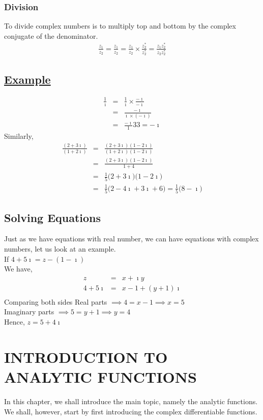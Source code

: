 \documentclass[11pt]{report}
\newcommand{\ubt}[1]{\textbf{\underline{#1}}}
\newcommand{\sps}{\\[0.2cm]}
\newcommand{\imaginary}{\imath}
\newcommand{\example}[1]{\section*{\ubt{Example #1}}}
\begin{document}
	\subsection{Division}
	To divide complex numbers is to multiply top and bottom by the complex conjugate of the denominator.
	\begin{eqnarray*}
		\frac{z_1}{z_2} = \frac{z_1}{z_2}= \frac{z_1}{z_2} \times \frac{z^{*}_2}{z^{*}_2} = \frac{z_1z^{*}_2}{z_2z^{*}_2}
	\end{eqnarray*}
	\example{}
	\begin{eqnarray*}
		\frac{1}{\imaginary} &=&\frac{1}{\imaginary} \times \frac{-\imaginary}{-\imaginary}\sps
		&=&\frac{-\imaginary}{\imaginary\times(-\imaginary)}\sps
		&=& \frac{-\imaginary}{1}33
		= -\imaginary		
	\end{eqnarray*}
	Similarly,
	\begin{eqnarray*}
		\frac{(2+3\imaginary)}{(1+2\imaginary)} &=& \frac{(2+3\imaginary)(1-2\imaginary)}{(1+2\imaginary)(1-2\imaginary)}\sps
		&=&\frac{(2+3\imaginary)(1-2\imaginary)}{1+4}\sps
		&=&\frac{1}{5}\Big(2+3\imaginary\Big)\Big(1-2\imaginary\Big)\sps
		&=&\frac{1}{5}\Big(2-4\imaginary+3\imaginary+6\Big)
		= \frac{1}{5}\Big(8-\imaginary\Big)
	\end{eqnarray*}
	
	\section{Solving Equations}
	Just as we have equations with real number, we can have equations with complex numbers, let us look at an example.\\
	If $4+5\imaginary = z - (1-\imaginary)$\\
	We have, 
	\begin{eqnarray*}
		z &=& x + \imaginary y\sps
		4+5\imaginary &=& x - 1 + (y+1)\imaginary\sps
	\end{eqnarray*}
	Comparing both sides
	Real parts $\implies 4 = x -1 \implies x = 5$\sps
	Imaginary parts $\implies 5 = y+1 \implies y = 4$\\
	Hence, $z = 5+4\imaginary$
	
	\chapter{INTRODUCTION TO ANALYTIC FUNCTIONS}
	In this chapter, we shall introduce the main topic, namely the analytic functions. We shall, however, start by first introducing the complex differentiable functions.
	
\end{document}
